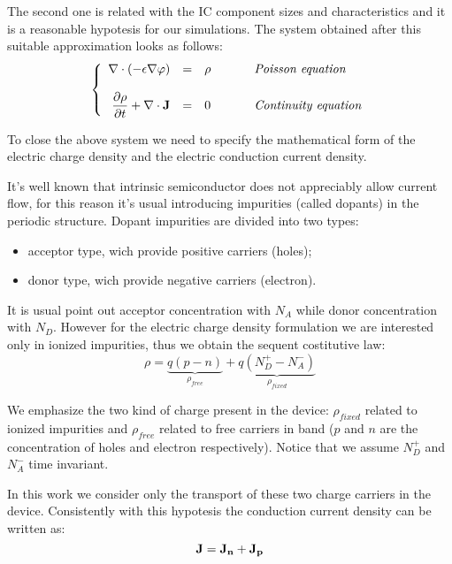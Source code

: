 The second one is related with the IC component sizes and characteristics and it is a reasonable hypotesis for our simulations.	
The system obtained after this suitable approximation looks as follows:
\begin{equation}
\left\{
\begin{array}{rcll}
\nabla \cdot (-\epsilon \nabla \varphi) & = & \rho &\psp{15} \textit{Poisson equation}\\ \\
\dfrac{\partial \rho}{\partial t} + \nabla \cdot \vect{J} & = & 0 &\psp{15} \textit{Continuity equation}\\
\end{array}
\right.
\end{equation} 

To close the above system we need to specify the mathematical form of the electric charge density and the electric conduction current density.

It's well known that intrinsic semiconductor does not appreciably allow current flow, for this reason it's usual introducing impurities (called dopants) in the periodic structure. Dopant impurities are divided into two types: 
\begin{itemize}
\item acceptor type, wich provide positive carriers (holes);
\item donor type, wich provide negative carriers (electron). 
\end{itemize}
It is usual point out acceptor concentration with $N_A$ while donor concentration with $N_D$. However for the electric charge density formulation we are interested only in ionized impurities, thus we obtain the sequent costitutive law:
\begin{equation}
\rho = \underbrace{q(p-n)}_{\rho_{free}} +\underbrace{q(N_D^+-N_A^-)}_{\rho_{fixed}}
\end{equation}

We emphasize the two kind of charge present in the device: $\rho_{fixed}$ related to ionized impurities and $\rho_{free}$ related to free carriers in band ($p$ and $n$ are the concentration of holes and electron respectively). Notice that we assume $N_D^+$ and $N_A^-$ time invariant.

In this work we consider only the transport of these two charge carriers in the device. Consistently with this hypotesis the conduction current density can be written as:
\begin{equation}
\mathbf{J} = \mathbf{J_n} + \mathbf{J_p}
\end{equation}


